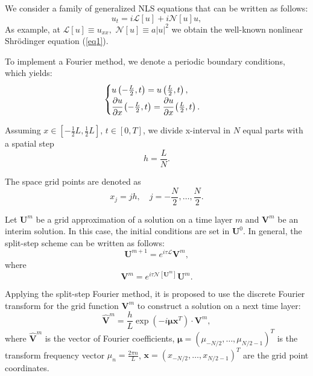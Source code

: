 \documentclass[preprint,12pt]{elsarticle}
\begin{document}
We consider a family of generalized NLS equations that can be written as follows:
\begin{equation}
u_{t}=i\mathscr{L} [u]+i\mathscr{N}[u]u,
\end{equation}
As example, at \(\mathscr{L} [u] \equiv u_{xx},  \,\,  \mathscr{N} [u] \equiv a|u|^2\) we obtain the well-known nonlinear Shr\"{o}dinger equation (\ref{eq1}).

To implement a Fourier method, we denote a periodic boundary conditions, which yields:
\begin{equation} \label{eq30}
\begin{aligned}
\begin{cases}
u\left(-\frac{L}{2},t\right)=u\left(\frac{L}{2},t\right),\\
\cfrac{\partial u}{\partial x}\left(-\frac{L}{2},t\right)=\cfrac{\partial u}{\partial x}\left(\frac{L}{2},t\right).
\end{cases}
\end{aligned}
\end{equation}

Assuming \( x \in [-\frac{1}{2} L, \frac{1}{2} L]\), \( t \in [0, T]\), we divide x-interval in \(N\) equal parts with a spatial step
\begin{equation}
h=\frac{L}{N}.
\end{equation}

The space grid points are denoted as
\begin{equation}
x_{j}=jh, \quad j= -\frac{N}{2}, \ldots , \frac{N}{2}.
\end{equation}

Let \(\boldsymbol{U}^{m}\) be a grid approximation of a solution on a time layer \(m\) and \(\boldsymbol{V}^{m}\) be an interim solution. In this case, the initial conditions are set in \(\boldsymbol{U}^{0}\). In general, the split-step scheme can be written as follows\cite{Rad1}:
\begin{equation}\label{eq34}
\boldsymbol{U}^{m+1}=e^{i\tau\mathscr{L}}\boldsymbol{V}^m,
\end{equation}
where
\begin{equation}\label{eq33}
\boldsymbol{V}^m=e^{i\tau\mathscr{N}[\boldsymbol{U}^m]}\boldsymbol{U}^m.
\end{equation}

Applying the split-step Fourier method, it is proposed to use the discrete Fourier transform for the grid function \(\boldsymbol{V}^m\) to construct a solution on a next time layer:
\begin{equation} 
\hat{\boldsymbol{V}}^m=\frac{h}{L}\exp\left(-i \boldsymbol{\mu} \boldsymbol{x}^{T}\right)\cdot \boldsymbol{V}^{m},
\end{equation}
where \(\hat{\boldsymbol{V}}^m\) is the vector of Fourier coefficients, \(\boldsymbol{\mu}=\left(\mu_{-N/2},\ldots,\mu_{N/2-1}\right)^{T}\) is the transform frequency vector \(\mu_{n}=\frac{2\pi n}{L}\), \(\boldsymbol{x}=\left(x_{-N/2},\ldots,x_{N/2-1}\right)^{T}\) are the grid point coordinates.
\end{document}
